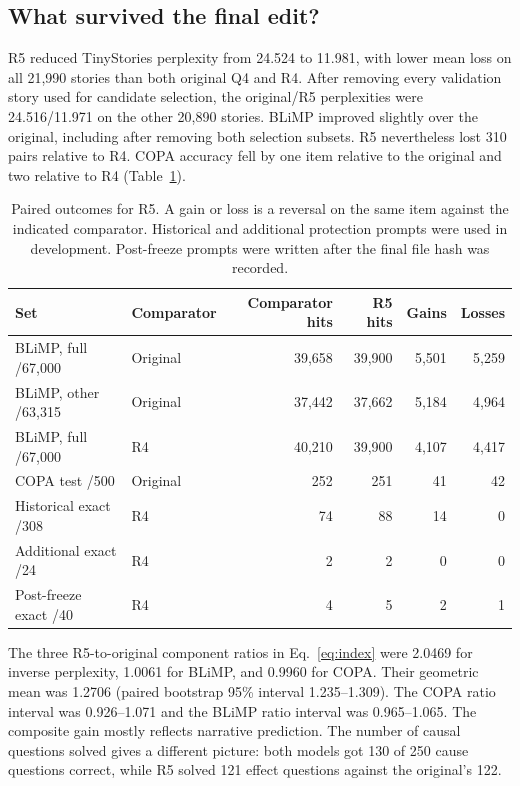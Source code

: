 \documentclass[11pt]{article}
\begin{document}
\subsection{What survived the final edit?}
R5 reduced TinyStories perplexity from 24.524 to 11.981, with lower mean loss on all 21,990 stories than both original Q4 and R4. After removing every validation story used for candidate selection, the original/R5 perplexities were 24.516/11.971 on the other 20,890 stories. BLiMP improved slightly over the original, including after removing both selection subsets. R5 nevertheless lost 310 pairs relative to R4. COPA accuracy fell by one item relative to the original and two relative to R4 (Table~\ref{tab:paired}).

\begin{table}[tbp]\centering\small
\caption{Paired outcomes for R5. A gain or loss is a reversal on the same item against the indicated comparator. Historical and additional protection prompts were used in development. Post-freeze prompts were written after the final file hash was recorded.}\label{tab:paired}
\begin{tabular}{@{}llrrrr@{}}\toprule
Set & Comparator & Comparator hits & R5 hits & Gains & Losses\\\midrule
BLiMP, full /67,000 & Original & 39,658 & 39,900 & 5,501 & 5,259\\
BLiMP, other /63,315 & Original & 37,442 & 37,662 & 5,184 & 4,964\\
BLiMP, full /67,000 & R4 & 40,210 & 39,900 & 4,107 & 4,417\\
COPA test /500 & Original & 252 & 251 & 41 & 42\\\midrule
Historical exact /308 & R4 & 74 & 88 & 14 & 0\\
Additional exact /24 & R4 & 2 & 2 & 0 & 0\\
Post-freeze exact /40 & R4 & 4 & 5 & 2 & 1\\\bottomrule
\end{tabular}
\end{table}

The three R5-to-original component ratios in Eq.~\ref{eq:index} were 2.0469 for inverse perplexity, 1.0061 for BLiMP, and 0.9960 for COPA. Their geometric mean was 1.2706 (paired bootstrap 95\% interval 1.235--1.309). The COPA ratio interval was 0.926--1.071 and the BLiMP ratio interval was 0.965--1.065. The composite gain mostly reflects narrative prediction. The number of causal questions solved gives a different picture: both models got 130 of 250 cause questions correct, while R5 solved 121 effect questions against the original's 122.
\end{document}
